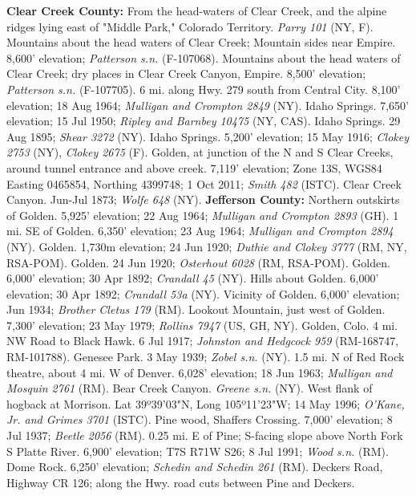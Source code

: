   \textbf{Clear Creek County:}
From the head-waters of Clear Creek, and the alpine ridges lying east of
"Middle Park," Colorado Territory. \textit{Parry 101} (NY, F).
Mountains about the head waters of Clear Creek; Mountain sides near Empire.
8,600' elevation; \textit{Patterson s.n.} (F-107068).
Mountains about the head waters of Clear Creek; dry places in Clear Creek
Canyon, Empire. 8,500' elevation; \textit{Patterson s.n.} (F-107705).
6 mi. along Hwy. 279 south from Central City. 8,100' elevation; 18 Aug 1964;
\textit{Mulligan and Crompton 2849} (NY).
Idaho Springs. 7,650' elevation; 15 Jul 1950;
\textit{Ripley and Barnbey 10475} (NY, CAS).
Idaho Springs. 29 Aug 1895; \textit{Shear 3272} (NY).
Idaho Springs. 5,200' elevation; 15 May 1916;
\textit{Clokey 2753} (NY), \textit{Clokey 2675} (F).
Golden, at junction of the N and S Clear Creeks, around tunnel entrance and
above creek. 7,119' elevation; Zone 13S, WGS84 Easting 0465854,
Northing 4399748; 1 Oct 2011; \textit{Smith 482} (ISTC).
Clear Creek Canyon. Jun-Jul 1873; \textit{Wolfe 648} (NY).
  \textbf{Jefferson County:}
Northern outskirts of Golden. 5,925' elevation; 22 Aug 1964;
\textit{Mulligan and Crompton 2893} (GH).
1 mi. SE of Golden. 6,350' elevation; 23 Aug 1964;
\textit{Mulligan and Crompton 2894} (NY).
Golden. 1,730m elevation; 24 Jun 1920;
\textit{Duthie and Clokey 3777} (RM, NY, RSA-POM).
Golden. 24 Jun 1920; \textit{Osterhout 6028} (RM, RSA-POM).
Golden. 6,000' elevation; 30 Apr 1892; \textit{Crandall 45} (NY).
Hills about Golden. 6,000' elevation; 30 Apr 1892; \textit{Crandall 53a} (NY).
Vicinity of Golden. 6,000' elevation; Jun 1934;
\textit{Brother Cletus 179} (RM).
Lookout Mountain, just west of Golden. 7,300' elevation; 23 May 1979;
\textit{Rollins 7947} (US, GH, NY).
Golden, Colo. 4 mi. NW Road to Black Hawk. 6 Jul 1917;
\textit{Johnston and Hedgcock 959} (RM-168747, RM-101788).
Genesee Park. 3 May 1939; \textit{Zobel s.n.} (NY).
1.5 mi. N of Red Rock theatre, about 4 mi. W of Denver. 6,028' elevation;
18 Jun 1963; \textit{Mulligan and Mosquin 2761} (RM).
Bear Creek Canyon. \textit{Greene s.n.} (NY).
West flank of hogback at Morrison. Lat 39º39'03"N, Long 105º11'23"W;
14 May 1996; \textit{O'Kane, Jr. and Grimes 3701} (ISTC).
Pine wood, Shaffers Crossing. 7,000' elevation; 8 Jul 1937;
\textit{Beetle 2056} (RM).
0.25 mi. E of Pine; S-facing slope above North Fork S Platte River.
6,900' elevation; T7S R71W S26; 8 Jul 1991; \textit{Wood s.n.} (RM).
Dome Rock. 6,250' elevation; \textit{Schedin and Schedin 261} (RM).
Deckers Road, Highway CR 126; along the Hwy. road cuts between Pine and Deckers.

